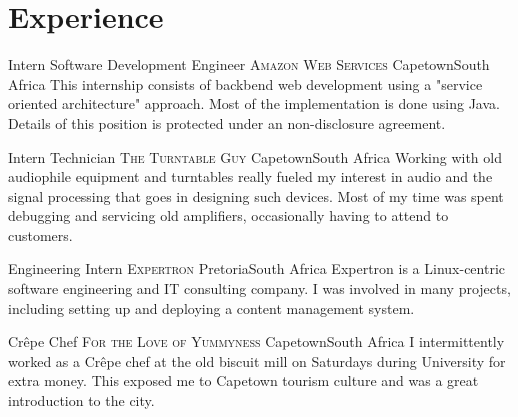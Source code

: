 \documentclass[11pt,a4paper,sans]{moderncv}
\begin{document}


\section{Experience}

{Intern Software Development Engineer}
{\textsc{Amazon Web Services}}
{\newline Capetown}{South Africa}
{This internship consists of backbend web development using a "service oriented
architecture" approach. Most of the implementation is done using Java. Details of
this position is protected under an non-disclosure agreement.}

{Intern Technician}
{\textsc{The Turntable Guy}}
{\newline Capetown}{South Africa}
{Working with old audiophile equipment and turntables really fueled my interest in
audio and the signal processing that goes in designing such devices. Most of my
time was spent debugging and servicing old amplifiers, occasionally having to
attend to customers.}

{Engineering Intern}
{\textsc{Expertron}}
{\newline Pretoria}{South Africa}
{Expertron is a Linux-centric software engineering and IT consulting company. I
was involved in many projects, including setting up and deploying a content
management system.}

{Cr\^epe Chef}
{\textsc{For the Love of Yummyness}}
{\newline Capetown}{South Africa}
{I intermittently worked as a Cr\^epe chef at the old biscuit mill on
Saturdays during University for extra money. This exposed me to Capetown tourism
culture and was a great introduction to the city.}
\end{document}
